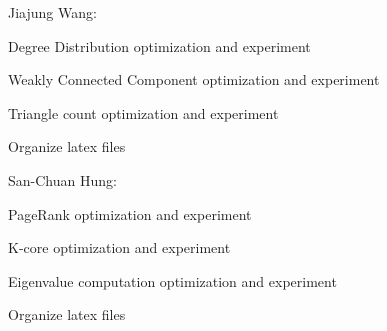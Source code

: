 \begin{itemize*}
\item
Jiajung Wang: 

\begin{itemize*}
\item
Degree Distribution optimization and experiment
\item
Weakly Connected Component optimization and experiment
\item
Triangle count optimization and experiment
\item
Organize latex files
\end{itemize*}

\item
San-Chuan Hung: 

\begin{itemize*}
\item 
PageRank optimization and experiment
\item 
K-core optimization and experiment
\item
Eigenvalue computation optimization and experiment
\item
Organize latex files
\end{itemize*}
\end{itemize*}
